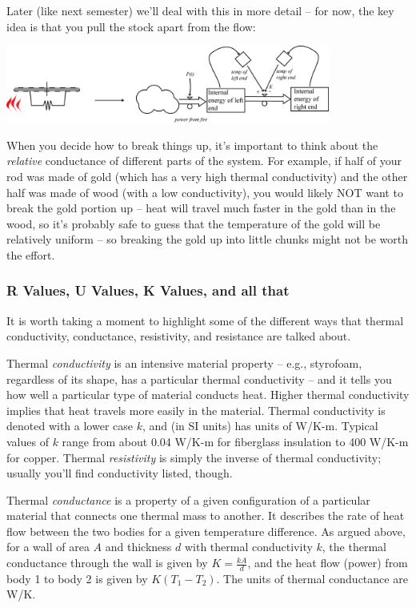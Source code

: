 \documentclass[10pt]{book}
\newcommand{\beforefig}{\vspace{0.2in}}
\newcommand{\afterfig}{\vspace{0.2in}}
\begin{document}
Later (like next semester) we'll deal with this in more detail -- for now, the key idea is that you pull the stock apart from the flow:


\beforefig
 \centerline{\includegraphics[height=1in]{figs/RodStockAndFlow}}
\afterfig

When you decide how to break things up, it's important to think about the {\it relative} conductance of different parts of the system.  For example, if half of your rod was made of gold (which has a very high thermal conductivity) and the other half was made of wood (with a low conductivity), you would likely NOT want to break the gold portion up -- heat will travel much faster in the gold than in the wood, so it's probably safe to guess that the temperature of the gold will be relatively uniform -- so breaking the gold up into little chunks might not be worth the effort. 

\subsubsection{R Values, U Values, K Values, and all that}
It is worth taking a moment to highlight some of the different ways that thermal conductivity, conductance, resistivity, and resistance are talked about.

Thermal {\it conductivity} is an intensive material property -- e.g., styrofoam, regardless of its shape, has a particular thermal conductivity -- and it tells you how well a particular type of material conducts heat.  Higher thermal conductivity implies that heat travels more easily in the material.  Thermal conductivity is denoted with a lower case $k$, and (in SI units) has units of W/K-m.  Typical values of $k$ range from about 0.04 W/K-m for fiberglass insulation to 400 W/K-m for copper.
Thermal {\it resistivity} is simply the inverse of thermal conductivity; usually you'll find conductivity listed, though.

Thermal {\it conductance} is a property of a given configuration of a particular material that connects one thermal mass to another.  It describes the rate of heat flow between the two bodies for a given temperature difference.  As argued above, for a wall of area $A$ and thickness $d$ with thermal conductivity $k$, the thermal conductance through the wall is given by $K = \frac{kA}{d}$, and the heat flow (power) from body 1 to body 2 is given by $K(T_1-T_2)$.  The units of thermal conductance are W/K.
\end{document}
